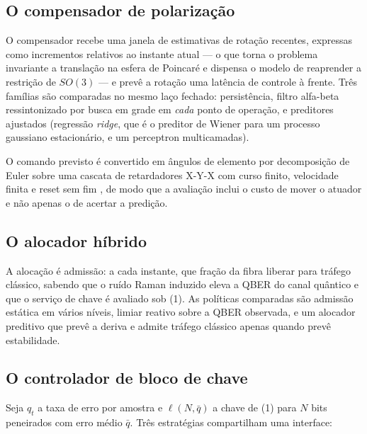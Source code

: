 \documentclass[12pt]{article}
\begin{document}
\subsection{O compensador de polarização}

O compensador recebe uma janela de estimativas de rotação recentes, expressas
como incrementos relativos ao instante atual --- o que torna o problema
invariante a translação na esfera de Poincaré e dispensa o modelo de reaprender
a restrição de $SO(3)$ --- e prevê a rotação uma latência de controle à frente.
Três famílias são comparadas no mesmo laço fechado: persistência, filtro
alfa-beta ressintonizado por busca em grade em \emph{cada} ponto de operação, e
preditores ajustados (regressão \emph{ridge}, que é o preditor de Wiener para
um processo gaussiano estacionário, e um perceptron multicamadas).

O comando previsto é convertido em ângulos de elemento por decomposição de
Euler sobre uma cascata de retardadores X-Y-X com curso finito, velocidade
finita e reset sem fim \cite{noe1988}, de modo que a avaliação inclui o custo
de mover o atuador e não apenas o de acertar a predição.

\subsection{O alocador híbrido}

A alocação é admissão: a cada instante, que fração da fibra liberar para
tráfego clássico, sabendo que o ruído Raman induzido \cite{kumar2015} eleva a
QBER do canal quântico e que o serviço de chave é avaliado sob (1). As
políticas comparadas são admissão estática em vários níveis, limiar reativo
sobre a QBER observada, e um alocador preditivo que prevê a deriva e admite
tráfego clássico apenas quando prevê estabilidade.

\subsection{O controlador de bloco de chave}

Seja $q_t$ a taxa de erro por amostra e $\ell(N,\bar q)$ a chave de (1) para
$N$ bits peneirados com erro médio $\bar q$. Três estratégias compartilham uma
interface:
\end{document}
